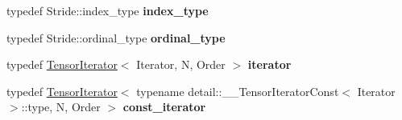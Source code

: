\begin{DoxyCompactItemize}
\item 
\hypertarget{classbtas_1_1_tensor_view_af8d4daa2074922441beef6802550b960}{
typedef Stride::index\_\-type {\bfseries index\_\-type}}
\label{classbtas_1_1_tensor_view_af8d4daa2074922441beef6802550b960}

\item 
\hypertarget{classbtas_1_1_tensor_view_a9a9749243c8bebfccc99e2605d1ab096}{
typedef Stride::ordinal\_\-type {\bfseries ordinal\_\-type}}
\label{classbtas_1_1_tensor_view_a9a9749243c8bebfccc99e2605d1ab096}

\item 
\hypertarget{classbtas_1_1_tensor_view_a451e11a5d944f7d737881cf056c362da}{
typedef \hyperlink{classbtas_1_1_tensor_iterator}{TensorIterator}$<$ Iterator, N, Order $>$ {\bfseries iterator}}
\label{classbtas_1_1_tensor_view_a451e11a5d944f7d737881cf056c362da}

\item 
\hypertarget{classbtas_1_1_tensor_view_a3f32179a6e270c1e82418d4e88b0cbc3}{
typedef \hyperlink{classbtas_1_1_tensor_iterator}{TensorIterator}$<$ typename detail::\_\-\_\-TensorIteratorConst$<$ Iterator $>$::type, N, Order $>$ {\bfseries const\_\-iterator}}
\label{classbtas_1_1_tensor_view_a3f32179a6e270c1e82418d4e88b0cbc3}

\end{DoxyCompactItemize}
